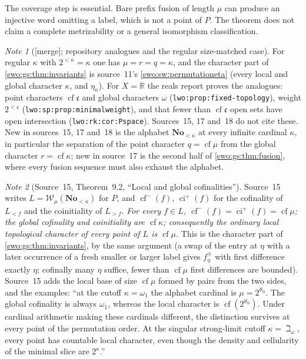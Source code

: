 \documentclass[11pt]{article}
\theoremstyle{definition}
\theoremstyle{remark}
\newtheorem{note}[note]{Note}
\newcommand{\No}{\mathbf{No}}
\newcommand{\WO}{\mathcal W}
\newcommand{\cf}{\operatorname{cf}}
\newcommand{\code}[1]{\texttt{\small #1}}
\newcommand{\merge}{\textsf{[merge]}}
\begin{document}
The coverage step is essential. Bare prefix fusion of length $\mu$ can
produce an injective word omitting a label, which is not a point of $P$.
The theorem does not claim a complete metrizability or a general
isomorphism classification.

\begin{note}[\merge; repository analogues and the regular size-matched case]\label{swo:vi:note:slice-analogues}
For regular $\kappa$ with $2^{<\kappa}=\kappa$ one has $\mu=r=q=\kappa$, and the
character part of \cref{swo:gs:thm:invariants} is source~11's
\cref{swo:sw:permutationeta} (every local and global character $\kappa$, and
$\eta_\kappa$). For $X=\mathbb R$ the reals report proves the analogues:
point characters $\cf\mathfrak c$ and global characters $\omega$
(\code{lwo:prop:fixed-topology}), weight $2^{<\mathfrak c}$
(\code{lwo:sp:prop:minimalweight}), and that fewer than $\cf\mathfrak c$ open sets
have open intersection (\code{lwo:rk:cor:Pspace}). Sources~15, 17 and~18 do not
cite these. New in sources~15, 17 and~18 is the alphabet $\No_{<\kappa}$ at
every infinite cardinal $\kappa$, in particular the separation of the point
character $q=\cf\mu$ from the global character $r=\cf\kappa$; new in
source~17 is the second half of \cref{swo:gs:thm:fusion}, where every
fusion sequence must also exhaust the alphabet.
\end{note}

\begin{note}[Source~15, Theorem~9.2, ``Local and global cofinalities'']\label{swo:cb:new:thm:local-characters}
Source~15 writes $L=\WO_\mu(\No_{<\kappa})$ for $P$, and
$\operatorname{cf}^-(f)$, $\operatorname{ci}^+(f)$ for the cofinality of
$L_{<f}$ and the coinitiality of $L_{>f}$. \emph{For every $f\in L$,
$\operatorname{cf}^{-}(f)=\operatorname{ci}^{+}(f)=\cf\mu$; the global
cofinality and coinitiality are $\cf\kappa$; consequently the ordinary local
topological character of every point of $L$ is $\cf\mu$.} This is the
character part of \cref{swo:gs:thm:invariants}, by the same argument (a swap of
the entry at $\eta$ with a later occurrence of a fresh smaller or larger label
gives $f^\mp_\eta$ with first difference exactly $\eta$; cofinally many $\eta$
suffice, fewer than $\cf\mu$ first differences are bounded). Source~15 adds the
local base of size $\cf\mu$ formed by pairs from the two sides, and the
examples: ``at the cutoff $\kappa=\omega_1$ the alphabet cardinal is
$\mu=2^{\aleph_0}$. The global cofinality is always $\omega_1$, whereas the
local character is $\cf(2^{\aleph_0})$. Under cardinal arithmetic making these
cardinals different, the distinction survives at every point of the
permutation order. At the singular strong-limit cutoff $\kappa=\beth_\omega$,
every point has countable local character, even though the density and
cellularity of the minimal slice are $2^\kappa$.''
\end{note}
\end{document}
